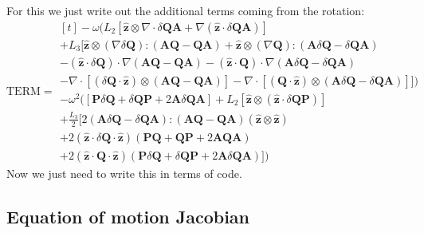 \documentclass[reqno]{article}
\newcommand{\Q}{\mathbf{Q}}
\newcommand{\bP}{\mathbf{P}}
\newcommand{\A}{\mathbf{A}}
\newcommand{\z}{\mathbf{\hat{z}}}
\begin{document}
For this we just write out the additional terms coming from the rotation:
\begin{equation}
    \text{TERM}
    =
    \begin{multlined}[t]
        -\omega \biggl(
        L_2 \left[
            \z \otimes \nabla \cdot \delta \Q \A + \nabla \left( \z \cdot \delta \Q \A \right)
            \right] \\
        +
        L_3 \bigl[
            \z \otimes \left( \nabla \delta \Q \right) : \left( \A \Q - \Q \A \right)
            + 
            \z \otimes \left( \nabla \Q \right) : \left( \A \delta \Q - \delta \Q \A \right) \\
            -
            \left( \z \cdot \delta \Q \right) \cdot \nabla \left( \A \Q - \Q \A \right)
            -
            \left( \z \cdot \Q \right) \cdot \nabla \left( \A \delta \Q - \delta \Q \A \right) \\
            -
            \nabla \cdot \left[ \left( \delta \Q \cdot \z \right) \otimes \left( \A \Q - \Q \A \right) \right]
            -
            \nabla \cdot \left[ \left( \Q \cdot \z \right) \otimes \left( \A \delta \Q - \delta \Q \A \right) \right]
            \bigr]
        \biggr) \\
        -
        \omega^2 \biggl(
        \left[
            \bP \delta \Q + \delta \Q \bP + 2 \A \delta \Q \A 
            \right]
        +
        L_2 \left[
            \z \otimes \left( \z \cdot \delta \Q \bP \right)
            \right] \\
        +
        \frac{L_3}{2} \bigl[
            2 \left( \A \delta \Q - \delta \Q \A \right) :
            \left( \A  \Q -  \Q \A \right) \left( \z \otimes \z \right) \\
            +
            2 \left( \z \cdot \delta \Q \cdot \z \right) \left( \bP \Q + \Q \bP + 2 \A \Q \A \right) \\
            +
            2 \left( \z \cdot \Q \cdot \z \right) \left( \bP \delta \Q + \delta \Q \bP + 2 \A \delta \Q \A \right)
            \bigr]
        \biggr)
    \end{multlined}
\end{equation}
Now we just need to write this in terms of code.

\subsection{Equation of motion Jacobian}
\end{document}
